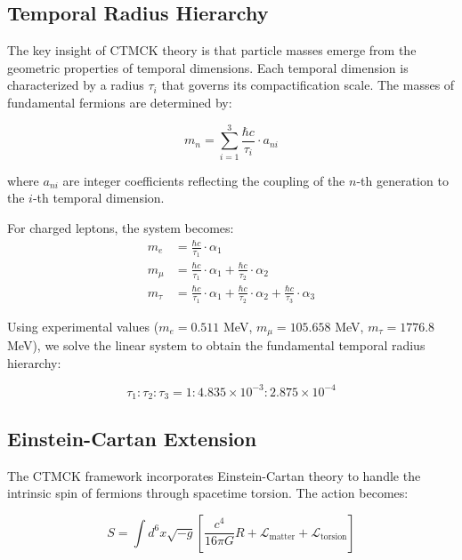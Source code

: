 \documentclass[reprint,amsmath,amssymb,aps,prd,nofootinbib,longbibliography]{revtex4-2}
\begin{document}
\subsection{Temporal Radius Hierarchy}

The key insight of CTMCK theory is that particle masses emerge from the geometric properties of temporal dimensions. Each temporal dimension is characterized by a radius $\tau_i$ that governs its compactification scale. The masses of fundamental fermions are determined by:

\begin{equation}
m_n = \sum_{i=1}^{3} \frac{\hbar c}{\tau_i} \cdot a_{ni}
\label{eq:mass_hierarchy}
\end{equation}

where $a_{ni}$ are integer coefficients reflecting the coupling of the $n$-th generation to the $i$-th temporal dimension.

For charged leptons, the system becomes:
\begin{align}
m_e &= \frac{\hbar c}{\tau_1} \cdot \alpha_1 \\
m_\mu &= \frac{\hbar c}{\tau_1} \cdot \alpha_1 + \frac{\hbar c}{\tau_2} \cdot \alpha_2 \\
m_\tau &= \frac{\hbar c}{\tau_1} \cdot \alpha_1 + \frac{\hbar c}{\tau_2} \cdot \alpha_2 + \frac{\hbar c}{\tau_3} \cdot \alpha_3
\end{align}

Using experimental values ($m_e = 0.511$ MeV, $m_\mu = 105.658$ MeV, $m_\tau = 1776.8$ MeV), we solve the linear system to obtain the fundamental temporal radius hierarchy:

\begin{equation}
\boxed{\tau_1 : \tau_2 : \tau_3 = 1 : 4.835 \times 10^{-3} : 2.875 \times 10^{-4}}
\label{eq:tau_hierarchy}
\end{equation}

\subsection{Einstein-Cartan Extension}

The CTMCK framework incorporates Einstein-Cartan theory to handle the intrinsic spin of fermions through spacetime torsion. The action becomes:

\begin{equation}
S = \int d^6x \sqrt{-g} \left[ \frac{c^4}{16\pi G} R + \mathcal{L}_{\text{matter}} + \mathcal{L}_{\text{torsion}} \right]
\label{eq:action_ec}
\end{equation}
\end{document}
